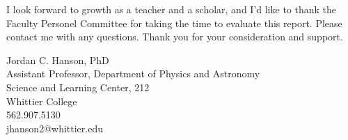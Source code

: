 \documentclass[../main.tex]{subfiles}
\begin{document}
I look forward to growth as a teacher and a scholar, and I'd like to thank the Faculty Personel Committee for taking the time to evaluate this report.  Please contact me with any questions.  Thank you for your consideration and support. \\ \hspace{0.1cm}

Jordan C. Hanson, PhD \\
Assistant Professor, Department of Physics and Astronomy \\
Science and Learning Center, 212 \\
Whittier College \\
562.907.5130 \\
jhanson2@whittier.edu
\end{document}
